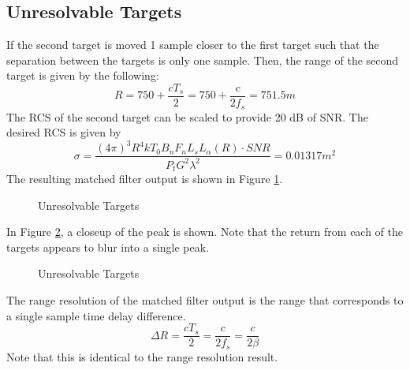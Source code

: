 \documentclass[12pt,letterpaper]{article}
\begin{document}
\subsection{Unresolvable Targets}
If the second target is moved 1 sample closer to the first target such that the separation between the targets is only one sample. Then, the range of the second target is given by the following:
\begin{equation}
R = 750 + \frac{cT_s}{2} = 750 + \frac{c}{2f_s} = 751.5 m
\end{equation}
The RCS of the second target can be scaled to provide 20 dB of SNR. The desired RCS is given by
\begin{equation}
\sigma = \frac{(4\pi)^3 R^4 k T_0 B_n F_n L_s L_\alpha(R)\cdot SNR}{P_t G^2 \lambda^2} = 0.01317  m^2
\end{equation}
The resulting matched filter output is shown in Figure \ref{Unresolvable Full}.
\begin{figure}[H]
\caption{Unresolvable Targets}
\label{Unresolvable Full}
\end{figure}
\noindent
In Figure \ref{Unresolvable Peak}, a closeup of the peak is shown. Note that the return from each of the targets appears to blur into a single peak.
\begin{figure}[H]
\caption{Unresolvable Targets}
\label{Unresolvable Peak}
\end{figure}
\noindent
The range resolution of the matched filter output is the range that corresponds to a single sample time delay difference.
\begin{equation}
\Delta R = \frac{cT_s}{2} = \frac{c}{2f_s} = \frac{c}{2\beta}
\end{equation}
Note that this is identical to the range resolution result.
\end{document}
